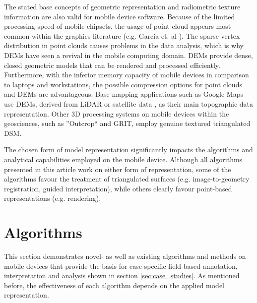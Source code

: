 \documentclass[review]{elsarticle}
\begin{document}

The stated base concepts of geometric representation and radiometric texture information are also valid for mobile device software. Because of the limited processing speed of mobile chipsets, the usage of point cloud appears most common within the graphics literature (e.g. Garcia et. al \cite{Garcia2015}). The sparse vertex distribution in point clouds causes problems in the data analysis, which is why \glspl{DEM} have seen a revival in the mobile computing domain. \Glspl{DEM} provide dense, closed geometric models that can be rendered and processed efficiently. Furthermore, with the inferior memory capacity of mobile devices in comparison to laptops and workstations, the possible compression options for point clouds and \glspl{DEM} are advantageous. Base mapping applications such as Google Maps use \glspl{DEM}, derived from \gls{LiDAR} or satellite data \cite{Farr2007}, as their main topographic data representation. Other 3D processing systems on mobile devices within the geosciences, such as ''Outcrop`` and \gls{GRIT}, employ genuine textured triangulated \gls{DSM}.%

The chosen form of model representation significantly impacts the algorithms and analytical capabilities employed on the mobile device. Although all algorithms presented in this article work on either form of representation, some of the algorithms favour the treatment of triangulated surfaces (e.g. image-to-geometry registration, guided interpretation), while others clearly favour point-based representations (e.g. rendering).

\section{Algorithms}
\label{sec:algorithms}

This section demonstrates novel- as well as existing algorithms and methods on mobile devices that provide the basis for case-specific field-based annotation, interpretation and analysis shown in section \ref{sec:case_studies}. As mentioned before, the effectiveness of each algorithm depends on the applied model representation.
\end{document}
